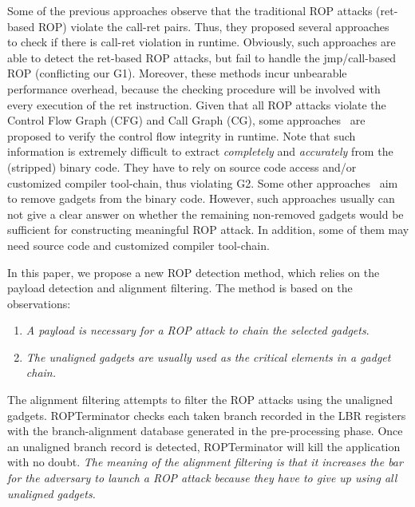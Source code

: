 Some of the previous approaches observe that the traditional ROP attacks (ret-based ROP) violate the call-ret pairs. Thus, they proposed several approaches ~\cite{ropdefender,drop} to check if there is call-ret violation in runtime. Obviously, such approaches are able to detect the ret-based ROP attacks, but fail to handle the jmp/call-based ROP (conflicting our G1). Moreover, these methods incur unbearable performance overhead, because the checking procedure will be involved with every execution of the ret instruction.
Given that all ROP attacks violate the Control Flow Graph (CFG) and Call Graph (CG), some approaches~\cite{cfi,cflocking} are proposed to verify the control flow integrity in runtime. Note that such information is extremely difficult to extract \emph{completely} and \emph{accurately} from the (stripped) binary code. They have to rely on source code access and/or customized compiler tool-chain, thus violating G2.
Some other approaches~\cite{smashing,g-free} aim to remove gadgets from the binary code. However, such approaches usually can not give a clear answer on whether the remaining non-removed gadgets would be sufficient for constructing meaningful ROP attack. In addition, some of them may need source code and customized compiler tool-chain.

In this paper, we propose a new ROP detection method, which relies on the payload detection and alignment filtering. The method is based on the observations:
\begin{enumerate}
\item \emph{A payload is necessary for a ROP attack to chain the selected gadgets}.
\item \emph{The unaligned gadgets are usually used as the critical elements in a gadget chain.}
\end{enumerate}


The alignment filtering attempts to filter the ROP attacks using the unaligned gadgets. ROPTerminator checks each taken branch recorded in the LBR registers with the branch-alignment database generated in the pre-processing phase. Once an unaligned branch record is detected, ROPTerminator will kill the application with no doubt. \emph{The meaning of the alignment filtering is that it increases the bar for the adversary to launch a ROP attack because they have to give up using all unaligned gadgets.}

